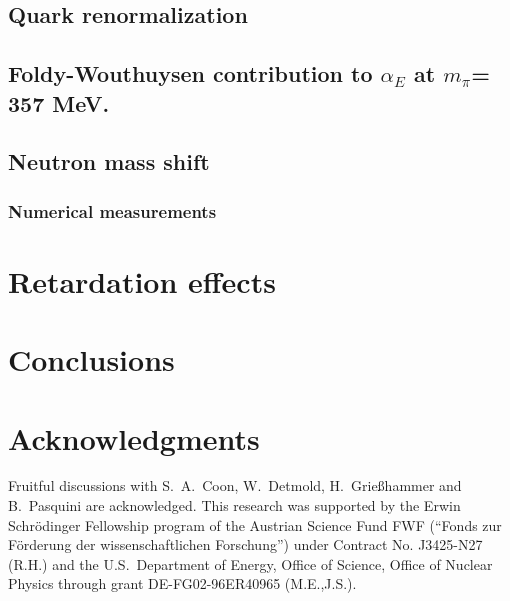 \documentclass[aps,prd,showpacs,showkeys,notitlepage,preprintnumbers,nofootinbib]{revtex4-1}
\begin{document}
\subsection{Quark renormalization}

\subsection{Foldy-Wouthuysen contribution to $\alpha_E$ at $m_\pi$= 357 MeV.}

\subsection{Neutron mass shift}
\subsubsection{Numerical measurements}






\section{Retardation effects}
\label{retardation}


\section{Conclusions}



\section*{Acknowledgments}
Fruitful discussions with S.~A.~Coon, W.~Detmold, H.~Grie\ss hammer and B.~Pasquini are acknowledged.
This research was supported by the Erwin Schr\"odinger Fellowship program of the Austrian Science Fund FWF (``Fonds zur F\"orderung der wissenschaftlichen Forschung'') under Contract No. J3425-N27 (R.H.) and the U.S.~Department of Energy, Office of Science, Office of Nuclear Physics through grant DE-FG02-96ER40965 (M.E.,J.S.).




\end{document}
